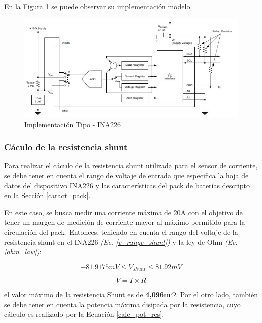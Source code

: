 \documentclass[10pt,a4paper]{article}
\begin{document}
En la Figura \ref{fig:ina226-commonimplementation} se puede observar su 
implementación modelo. 

\begin{figure}[h!]
    \begin{center}
	\includegraphics[width=0.7\linewidth]{assets/INA226-Common_Implementation}
	\caption{Implementación Tipo - INA226}
	\label{fig:ina226-commonimplementation}
    \end{center}	
\end{figure}
\FloatBarrier

\subsubsection{C\'aculo de la resistencia shunt}

Para realizar el c\'aculo de la resistencia shunt utilizada para el sensor de
corriente, se debe tener en cuenta el rango de voltaje de entrada que
especifica la hoja de datos del dispositivo INA226 y las caracter\'isticas del
pack de bater\'ias descripto en la Secci\'on \ref{caract_pack}. 

En este caso, se busca medir una corriente m\'axima de 20A con el objetivo de
tener un margen de medici\'on de corriente mayor al m\'aximo permitido para la
circulaci\'on del pack. Entonces, teniendo en cuenta el rango del voltaje de
la resistencia shunt en el INA226 \emph{(Ec. \ref{v_range_shunt})} y la ley de
Ohm \emph{(Ec. \ref{ohm_law})}:

\begin{equation}
    -81.9175mV \le V_{shunt} \le 81.92mV  \label{v_range_shunt}
\end{equation}

\begin{equation}
    V=I \times R \label{ohm_law}
\end{equation}

el valor m\'aximo de la resistencia Shunt es de \textbf{4,096m$\Omega$}. Por el
otro lado, tambi\'en se debe tener en cuenta la potencia m\'axima disipada por
la resistencia, cuyo c\'alculo es realizado por la Ecuaci\'on 
\ref{calc_pot_res},
\end{document}
